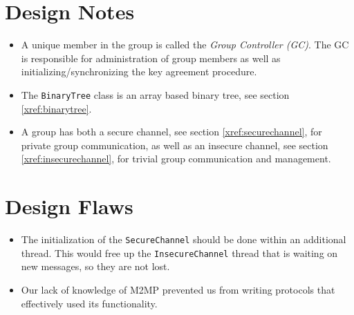 \documentclass[12pt]{article}
\newcommand{\code}[1]{\texttt{#1}}
\begin{document}
    \section{Design Notes}
    \label{xfer:design_notes}
     \begin{itemize}
       \item	A unique member in the group is called the \textit{Group 
		Controller (GC)}.  The GC is responsible for administration
		of group members as well as initializing/synchronizing the key 
		agreement procedure.
       \item    The \code{BinaryTree} class is an array based binary tree, see 
		section \ref{xref:binarytree}.
       \item    A group has both a secure channel, see section
		\ref{xref:securechannel}, for private group communication, as
		well as an insecure channel, see section 
		\ref{xref:insecurechannel}, for trivial group communication and
		management.
     \end{itemize}
    \section{Design Flaws}
    \label{xfer:design_flaws}
     \begin{itemize}
       \item    The initialization of the \code{SecureChannel} should be done
		within an additional thread.  This would free up the 
                \code{InsecureChannel} thread that is waiting on new messages, 
		so they are not lost.
       \item    Our lack of knowledge of M2MP prevented us from writing 
		protocols that effectively used its functionality.
     \end{itemize}
\end{document}
